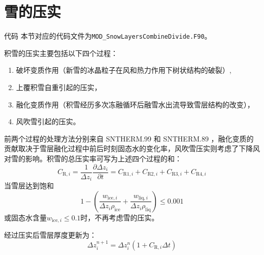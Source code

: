 \section{雪的压实}\label{雪的压实}
\begin{mymdframed}{代码}
  本节对应的代码文件为\texttt{MOD\_SnowLayersCombineDivide.F90}。
\end{mymdframed}

积雪的压实主要包括以下四个过程：
\begin{enumerate}
  \item 破坏变质作用（新雪的冰晶粒子在风和热力作用下树状结构的破裂）,
  \item 上覆积雪自重引起的压实，
  \item 融化变质作用（积雪经历多次冻融循环后融雪水出流导致雪层结构的改变），
  \item 风吹雪引起的压实。
\end{enumerate}

前两个过程的处理方法分别来自 SNTHERM.99 \citep{jordan1999heat}和 SNTHERM.89 \citep{jordan1991one}，融化变质的贡献取决于雪层融化过程中前后时刻固态水的变化率，风吹雪压实则考虑了下降风对雪的影响。积雪的总压实率可写为上述四个过程的和：
%
\begin{equation}
  C_{\mathrm{R},i}=\frac{1}{\Delta {z_i}} \frac{\partial \Delta {z_i}}{\partial {t}}=C_{\mathrm{R1},i}+C_{\mathrm{R2},i}+C_{\mathrm{R3},i}+C_{\mathrm{R4},i}
\end{equation}
当雪层达到饱和
\begin{equation}
  1-\left(\frac{w_{\mathrm{ice},i}}{ \Delta {z_i} \rho_{\mathrm{ice}}}+\frac{w_{\mathrm{liq},i}}{ \Delta {z_i} \rho_{\mathrm{liq}}}\right) \leqslant 0.001
\end{equation}
或固态水含量$w_{\mathrm{ice},i}\leqslant0.1$时，不再考虑雪的压实。

经过压实后雪层厚度更新为：
\begin{equation}
  \Delta z_i^{n+1}=\Delta z_i^n\left(1+C_{\mathrm{R},i} \Delta t\right)
\end{equation}


